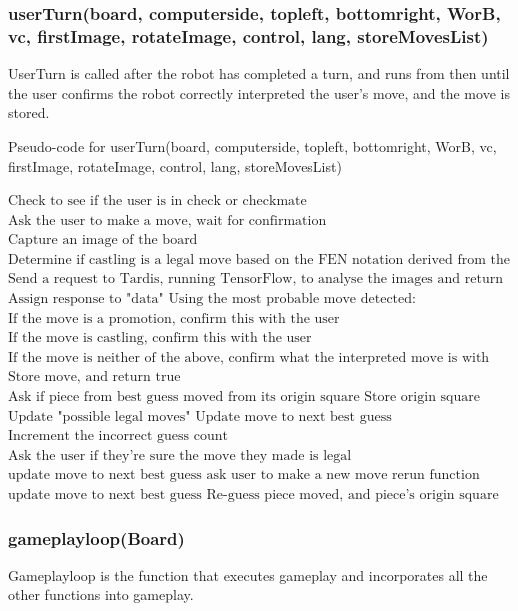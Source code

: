 \documentclass[onecolumn]{IEEEtran}
\begin{document}
\newpage
\subsubsection{userTurn(board, computerside, topleft, bottomright, WorB, vc, firstImage, rotateImage, control, lang, storeMovesList)}
UserTurn is called after the robot has completed a turn, and runs from then until the user confirms the robot correctly interpreted the user's move, and the move is stored. 

\begin{algorithm}[H]
\caption{Pseudo-code for userTurn(board, computerside, topleft, bottomright, WorB, vc, firstImage, rotateImage, control, lang, storeMovesList)}
\begin{algorithmic}[1]
\STATE $\text{Check to see if the user is in check or checkmate}$
\STATE $\text{Ask the user to make a move, wait for confirmation}$
\STATE $\text{Capture an image of the board}$
\STATE $\text{Determine if castling is a legal move based on the FEN notation derived from the "board" input}$
\STATE $\text{Send a request to Tardis, running TensorFlow, to analyse the images and return expected moves}$
\STATE $\text{Assign response to "data"}$
\STATE $\text{Using the most probable move detected:}$
\STATE $\text{If the move is a promotion, confirm this with the user}$
\STATE $\text{If the move is castling, confirm this with the user}$
\STATE $\text{If the move is neither of the above, confirm what the interpreted move is with the user}$
	\STATE $\text{Store move, and return true}$
\ELSE
	\STATE $\text{Ask if piece from best guess moved from its origin square}$
			\STATE $\text{Store origin square}$
			\STATE $\text{Update "possible legal moves"}$
			\STATE $\text{Update move to next best guess}$
		\ELSE
			\STATE $\text{Increment the incorrect guess count}$
			\STATE $\text{Ask the user if they're sure the move they made is legal}$
				\STATE $\text{update move to next best guess}$
				\ELSE
				\STATE $\text{ask user to make a new move}$
				\STATE $\text{rerun function}$
				\ENDIF
			\ELSE
			\STATE $\text{update move to next best guess}$
			\STATE $\text{Re-guess piece moved, and piece's origin square}$
			\ENDIF
		\ENDIF
	\ENDIF
\ENDIF
\end{algorithmic}
\end{algorithm}

\newpage
\subsubsection{gameplayloop(Board)}
Gameplayloop is the function that executes gameplay and incorporates all the other functions into gameplay. 
\end{document}
